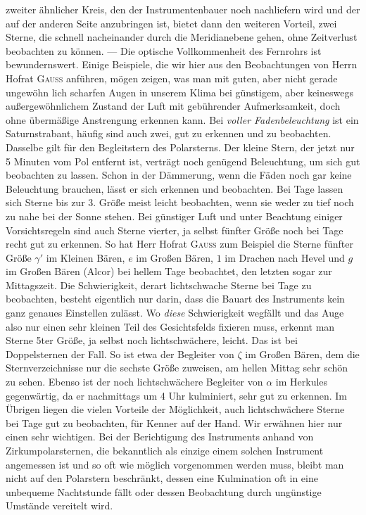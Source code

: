 zweiter ähnlicher Kreis, den der Instrumentenbauer noch nachliefern wird und der auf der anderen Seite anzubringen ist, bietet dann den weiteren Vorteil, zwei Sterne, die schnell nacheinander durch die Meridianebene gehen, ohne Zeitverlust beobachten zu können. ---
Die optische Vollkommenheit des Fernrohrs ist bewundernswert. Einige Beispiele, die wir hier aus den Beobachtungen von Herrn Hofrat \textsc{Gauss} anführen, mögen zeigen, was man mit guten, aber nicht gerade ungewöhn%
%
lich scharfen Augen in unserem Klima bei günstigem, aber keineswegs außergewöhnlichem Zustand der Luft mit gebührender Aufmerksamkeit, doch ohne übermäßige Anstrengung erkennen kann. Bei \emph{voller Fadenbeleuchtung} ist ein Saturnstrabant, häufig sind auch zwei, gut zu erkennen und zu beobachten. Dasselbe gilt für den Begleitstern des Polarsterns. Der kleine Stern, der jetzt nur 5 Minuten vom Pol entfernt ist, verträgt noch genügend Beleuchtung, um sich gut beobachten zu lassen. Schon in der Dämmerung, wenn die Fäden noch gar keine Beleuchtung brauchen, lässt er sich erkennen und beobachten. Bei Tage lassen sich Sterne bis zur 3. Größe meist leicht beobachten, wenn sie weder zu tief noch zu nahe bei der Sonne stehen. Bei günstiger Luft und unter Beachtung einiger Vorsichtsregeln sind auch Sterne vierter, ja selbst fünfter Größe noch bei Tage recht gut zu erkennen. So hat Herr Hofrat \textsc{Gauss} zum Beispiel die Sterne fünfter Größe $\gamma'$ im Kleinen Bären, $e$ im Großen Bären, $1$ im Drachen nach Hevel und $g$ im Großen Bären (Alcor) bei hellem Tage beobachtet, den letzten sogar zur Mittagszeit. Die Schwierigkeit, derart lichtschwache Sterne bei Tage zu beobachten, besteht eigentlich nur darin, dass die Bauart des Instruments kein ganz genaues Einstellen zulässt. Wo \emph{diese} Schwierigkeit wegfällt und das Auge also nur einen sehr kleinen Teil des Gesichtsfelds fixieren muss, erkennt man Sterne 5ter Größe, ja selbst noch lichtschwächere, leicht. Das ist bei Doppelsternen der Fall. So ist etwa der Begleiter von $\zeta$ im Großen Bären, dem die Sternverzeichnisse nur die sechste Größe zuweisen, am hellen Mittag sehr schön zu sehen. Ebenso ist der noch lichtschwächere Begleiter von $\alpha$ im Herkules gegenwärtig, da er nachmittags um 4 Uhr kulminiert, sehr gut zu erkennen. Im Übrigen liegen die vielen Vorteile der Möglichkeit, auch lichtschwächere Sterne bei Tage gut zu beobachten, für Kenner auf der Hand. Wir erwähnen hier nur einen sehr wichtigen. Bei der Berichtigung des Instruments anhand von Zirkumpolarsternen, die bekanntlich als einzige einem solchen Instrument angemessen ist und so oft wie möglich vorgenommen werden muss, bleibt man nicht auf den Polarstern beschränkt, dessen eine Kulmination oft in eine unbequeme Nachtstunde fällt oder dessen Beobachtung durch ungünstige Umstände vereitelt wird.

